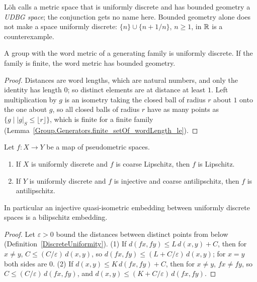 L\"oh calls a metric space that is uniformly discrete and has bounded geometry a \emph{UDBG
space}; the conjunction gets no name here. Bounded geometry alone does not make a space
uniformly discrete: $\{n\} \cup \{n + 1/n\}$, $n \ge 1$, in $\mathbb{R}$ is a counterexample.

\begin{lemma}
  \label{Group.Generators.WithWordMetric.hasBoundedGeometry}
  A group with the word metric of a generating family is uniformly discrete. If the family is
  finite, the word metric has bounded geometry.
\end{lemma}
\begin{proof}
  Distances are word lengths, which are natural numbers, and only the identity has length
  $0$; so distinct elements are at distance at least $1$. Left multiplication by $g$ is an
  isometry taking the closed ball of radius $r$ about $1$ onto the one about $g$, so all closed
  balls of radius $r$ have as many points as $\{g \mid |g|_S \le \lfloor r \rfloor\}$, which is
  finite for a finite family (Lemma~\ref{Group.Generators.finite_setOf_wordLength_le}).
\end{proof}

\begin{lemma}
  \label{Metric.CoarseLipschitzWith.exists_lipschitzWith}
  Let $f \colon X \to Y$ be a map of pseudometric spaces.
  \begin{enumerate}
    \item If $X$ is uniformly discrete and $f$ is coarse Lipschitz, then $f$ is Lipschitz.
    \item If $Y$ is uniformly discrete and $f$ is injective and coarse antilipschitz, then $f$ is
          antilipschitz.
  \end{enumerate}
  In particular an injective quasi-isometric embedding between uniformly discrete spaces is a
  bilipschitz embedding.
\end{lemma}
\begin{proof}
  Let $\varepsilon > 0$ bound the distances between distinct points from below
  (Definition~\ref{DiscreteUniformity}). (1) If $d(f x, f y) \le L\,d(x, y) + C$, then for $x \ne
  y$, $C \le (C/\varepsilon)\,d(x, y)$, so $d(f x, f y) \le (L + C/\varepsilon)\,d(x, y)$; for $x =
  y$ both sides are $0$. (2) If $d(x, y) \le K\,d(f x, f y) + C$, then for $x \ne y$, $f x \ne f y$,
  so $C \le (C/\varepsilon)\,d(f x, f y)$, and $d(x, y) \le (K + C/\varepsilon)\,d(f x, f y)$.
\end{proof}

